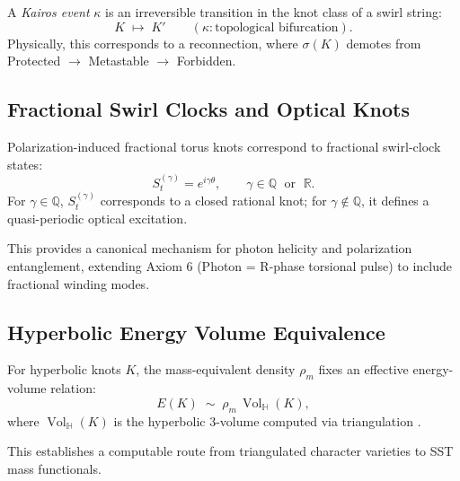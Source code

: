 \documentclass[10pt,reprint,aps,onecolumn,nofootinbib]{revtex4-2}
\newcommand{\Vol}{\operatorname{Vol}}   %
\begin{document}
    \begin{definition}
        A \emph{Kairos event} $\kappa$ is an irreversible transition in the knot class of a swirl string:
        \[
            K \;\mapsto\; K' \qquad (\kappa: \text{topological bifurcation}).
        \]
        Physically, this corresponds to a reconnection, where $\sigma(K)$ demotes from Protected $\to$ Metastable $\to$ Forbidden.
    \end{definition}

    \subsection{Fractional Swirl Clocks and Optical Knots}

    \begin{theorem}
        Polarization-induced fractional torus knots correspond to fractional swirl-clock states:
        \[
            S_t^{(\gamma)} = e^{i \gamma \theta}, \qquad \gamma \in \mathbb{Q}\;\text{ or }\;\mathbb{R}.
        \]
        \]
        For $\gamma \in \mathbb{Q}$, $S_t^{(\gamma)}$ corresponds to a closed rational knot; for $\gamma \notin \mathbb{Q}$, it defines a quasi-periodic optical excitation.
    \end{theorem}

    This provides a canonical mechanism for photon helicity and polarization entanglement, extending Axiom 6 (Photon = R-phase torsional pulse) to include fractional winding modes.

    \subsection{Hyperbolic Energy Volume Equivalence}

    \begin{axiom}
        For hyperbolic knots $K$, the mass-equivalent density $\rho_{\!m}$ fixes an effective energy-volume relation:
        \[
            E(K) \;\sim\; \rho_{\!m}\,\Vol_{\!\mathbb{H}}(K),
        \]
        where $\Vol_{\!\mathbb{H}}(K)$ is the hyperbolic 3-volume computed via triangulation \cite{Purcell2025,Petersen2024}.
    \end{axiom}

    This establishes a computable route from triangulated character varieties to SST mass functionals.
\end{document}
